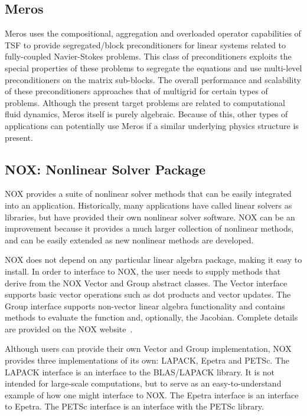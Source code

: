 \documentclass[12pt,relax]{TrilinosOverview}
\begin{document}
\subsection{Meros}

Meros uses the compositional, aggregation and overloaded operator capabilities of
TSF to provide segregated/block preconditioners for linear systems
related to fully-coupled Navier-Stokes problems.  This class of
preconditioners exploits the special properties of these problems to
segregate the equations and use multi-level preconditioners on the
matrix sub-blocks.  The overall performance and scalability of these
preconditioners approaches that of multigrid for certain types of
problems.  Although the present target problems are related to
computational fluid dynamics, Meros itself is purely algebraic.
Because of this, other types of applications can potentially use Meros
if a similar underlying physics structure is present.


\subsection{NOX: Nonlinear Solver Package}

NOX provides a suite of nonlinear solver methods that can be easily integrated
into an application.  Historically, many
applications have called linear solvers as libraries, but have 
provided their own nonlinear solver software.  NOX
can be an improvement because it provides a much larger collection 
of nonlinear methods,
and can be easily extended as new nonlinear methods are developed.  

NOX does not depend on any particular linear algebra package, 
making it easy to install. In order to interface to NOX, the 
user needs to supply methods that derive from the 
NOX Vector and Group abstract classes.
The Vector interface supports basic vector operations such as dot 
products and vector updates. 
The Group interface supports non-vector linear algebra functionality 
and contains methods to evaluate the function and, optionally, the Jacobian.
Complete details are provided on the NOX website~\cite{NOX-home-page}.

Although users can provide their own Vector and Group implementation, 
NOX provides three implementations
of its own: LAPACK, Epetra and PETSc.
The LAPACK interface is an interface to the BLAS/LAPACK library. 
It is not intended for large-scale
computations, but to serve as an easy-to-understand example of
how one might interface to NOX. 
The Epetra interface is an interface to Epetra.
The PETSc interface is an interface with the PETSc library. 
\end{document}
